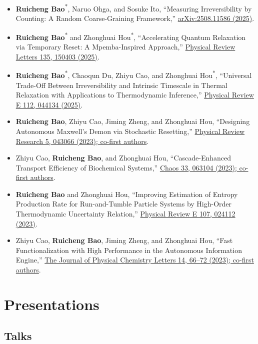 \documentclass[10pt,a4paper]{article}
\newcommand{\pub}[4]{%
  \item #1, ``#2,'' \href{#4}{#3}.
}
\newcommand{\corr}[1]{#1\textsuperscript{*}}
\begin{document}
\begin{itemize}
  \pub{\corr{\textbf{Ruicheng Bao}}, Naruo Ohga, and Sosuke Ito}{Measuring Irreversibility by Counting: A Random Coarse-Graining Framework}{arXiv:2508.11586 (2025)}{https://arxiv.org/abs/2508.11586}
  \pub{\corr{\textbf{Ruicheng Bao}} and \corr{Zhonghuai Hou}}{Accelerating Quantum Relaxation via Temporary Reset: A Mpemba-Inspired Approach}{Physical Review Letters 135, 150403 (2025)}{https://doi.org/10.1103/g94p-7421}
  \pub{\corr{\textbf{Ruicheng Bao}}, Chaoqun Du, Zhiyu Cao, and \corr{Zhonghuai Hou}}{Universal Trade-Off Between Irreversibility and Intrinsic Timescale in Thermal Relaxation with Applications to Thermodynamic Inference}{Physical Review E 112, 044134 (2025)}{https://doi.org/10.1103/fmsz-rdbj}
  \pub{\textbf{Ruicheng Bao}, Zhiyu Cao, Jiming Zheng, and Zhonghuai Hou}{Designing Autonomous Maxwell's Demon via Stochastic Resetting}{Physical Review Research 5, 043066 (2023); co-first authors}{https://doi.org/10.1103/PhysRevResearch.5.043066}
  \pub{Zhiyu Cao, \textbf{Ruicheng Bao}, and Zhonghuai Hou}{Cascade-Enhanced Transport Efficiency of Biochemical Systems}{Chaos 33, 063104 (2023); co-first authors}{https://doi.org/10.1063/5.0146769}
  \pub{\textbf{Ruicheng Bao} and Zhonghuai Hou}{Improving Estimation of Entropy Production Rate for Run-and-Tumble Particle Systems by High-Order Thermodynamic Uncertainty Relation}{Physical Review E 107, 024112 (2023)}{https://doi.org/10.1103/PhysRevE.107.024112}
  \pub{Zhiyu Cao, \textbf{Ruicheng Bao}, Jiming Zheng, and Zhonghuai Hou}{Fast Functionalization with High Performance in the Autonomous Information Engine}{The Journal of Physical Chemistry Letters 14, 66--72 (2023); co-first authors}{https://doi.org/10.1021/acs.jpclett.2c03335}
\end{itemize}

\section{Presentations}

\subsection{Talks}
\end{document}
